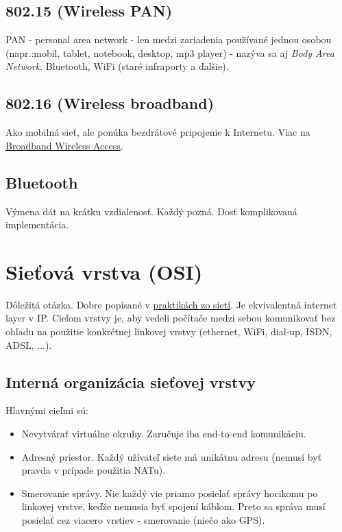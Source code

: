 \documentclass[10pt,a4paper]{article}
\begin{document}
\subsection{802.15 (Wireless PAN)} 
PAN - personal area network - len medzi zariadenia používané jednou osobou (napr.:mobil, tablet, notebook, desktop, mp3 player) - nazýva sa aj \emph{Body Area Network}.
Bluetooth, WiFi (staré infraporty a ďalšie). 
\subsection{802.16 (Wireless broadband)}
Ako mobilná sieť, ale ponúka bezdrátové pripojenie k Internetu.
Viac na \href{http://en.wikipedia.org/wiki/Broadband\_Wireless\_Access}{Broadband Wireless Access}. 
       
\subsection{Bluetooth}           
Výmena dát na krátku vzdialenosť. Každý pozná. 
Dosť komplikovaná implementácia. 
                                                 
\section{Sieťová vrstva (OSI)}     
Dôležitá otázka. Dobre popísané v \href{http://netlab.dcs.fmph.uniba.sk/siete/cviko3/}{praktikách zo sietí}. Je ekvivalentná internet layer v IP. 
Cieľom vrstvy je, aby vedeli počítače medzi sebou komunikovať bez ohľadu na použitie konkrétnej linkovej vrstvy (ethernet, WiFi, dial-up, ISDN, ADSL, ...). 
                 
\subsection{Interná organizácia sieťovej vrstvy} 

Hlavnými cieľmi sú: 
\begin{itemize}
\item Nevytvárať virtuálne okruhy. Zaručuje iba end-to-end komunikáciu. 
\item Adresný priestor. Každý užívateľ siete má unikátnu adresu (nemusí byť pravda v prípade použitia NATu).  
\item Smerovanie správy. Nie každý vie priamo posielať správy hocikomu po linkovej vrstve, keďže nemusia byť spojení káblom. Preto sa správa musí posielať cez viacero vrstiev - smerovanie (niečo ako GPS). 
\end{itemize}
\end{document}
